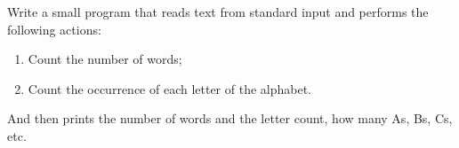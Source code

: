 \begin{Exercise}[title={Word and letter count},difficulty=5]
\label{ex:wc}
\Question\label{ex:wc q1} Write a small program that reads text from
standard input and performs the following actions:
\begin{enumerate}
\item{Count the number of words;}
\item{Count the occurrence of each letter of the alphabet.}
\end{enumerate}
And then prints the number of words and the letter count, how many As,
Bs, Cs, etc.
\end{Exercise}

\begin{Answer}
\Question 
\end{Answer}
